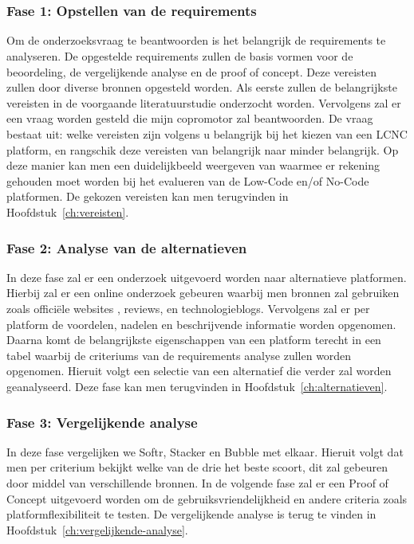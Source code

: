 
\chapter{}%
\label{ch:methodologie}

\subsection*{Fase 1: Opstellen van de requirements}%
\label{sec:opstellen-van-de-requirements}
Om de onderzoeksvraag te beantwoorden is het belangrijk 
de requirements te analyseren. De opgestelde requirements zullen de basis vormen voor de beoordeling, de vergelijkende analyse en de proof of concept.
Deze vereisten zullen door diverse bronnen opgesteld worden. Als eerste
zullen de belangrijkste vereisten in de voorgaande literatuurstudie onderzocht worden. Vervolgens zal er een vraag
worden gesteld die mijn copromotor zal beantwoorden. De vraag bestaat uit: welke vereisten zijn volgens u belangrijk bij het kiezen van een 
LCNC platform, en rangschik deze vereisten van belangrijk naar minder belangrijk. Op deze manier kan men een duidelijkbeeld weergeven van waarmee er rekening gehouden moet worden 
bij het evalueren van de Low-Code en/of No-Code platformen. De gekozen vereisten kan men terugvinden in Hoofdstuk~\ref{ch:vereisten}.

\subsection*{Fase 2: Analyse van de alternatieven}%
\label{sec:analyse-van-de-alternatieven}
In deze fase zal er een onderzoek uitgevoerd worden naar alternatieve platformen.
Hierbij zal er een online onderzoek gebeuren waarbij men bronnen zal gebruiken zoals 
officiële websites , reviews, en technologieblogs. Vervolgens zal er per platform de 
voordelen, nadelen en beschrijvende informatie worden opgenomen. Daarna komt 
de belangrijkste eigenschappen van een platform terecht in een tabel waarbij de criteriums
van de requirements analyse zullen worden opgenomen. Hieruit volgt een selectie van een 
alternatief die verder zal worden geanalyseerd. Deze fase kan men terugvinden in Hoofdstuk~\ref{ch:alternatieven}.


\subsection*{Fase 3: Vergelijkende analyse}%
\label{sec:vergelijkende-analyse}
In deze fase vergelijken we Softr, Stacker en Bubble met elkaar.
Hieruit volgt dat men per criterium bekijkt welke van de drie het beste scoort, dit zal gebeuren door middel van verschillende bronnen.
In de volgende fase zal er een Proof of Concept uitgevoerd worden om de gebruiksvriendelijkheid en andere criteria zoals platformflexibiliteit te testen.
De vergelijkende analyse is terug te vinden in Hoofdstuk~\ref{ch:vergelijkende-analyse}.

